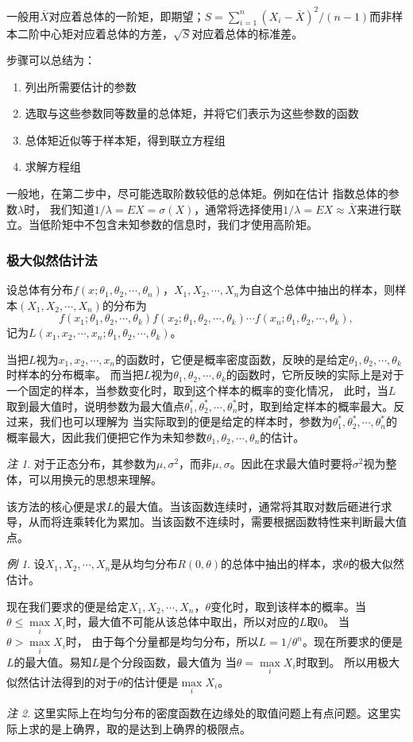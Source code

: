 \documentclass[a4paper,11pt]{article}%
\theoremstyle{remark}
\newtheorem*{remark}{注}
\theoremstyle{remark}
\newtheorem*{example}{例}
\theoremstyle{definition}
\theoremstyle{definition}
\theoremstyle{plain}
\begin{document}
一般用$\bar{X}$对应着总体的一阶矩，即期望；$S=\sum_{i=1}^{n}(X_i-\bar{X})^2/(n-1)$而非样本二阶中心矩对应着总体的方差，$\sqrt{S}$对应着总体的标准差。

步骤可以总结为：
\begin{enumerate}
    \item 列出所需要估计的参数
    \item 选取与这些参数同等数量的总体矩，并将它们表示为这些参数的函数
    \item 总体矩近似等于样本矩，得到联立方程组
    \item 求解方程组
\end{enumerate}
一般地，在第二步中，尽可能选取阶数较低的总体矩。例如在估计 指数总体的参数$\lambda$时， 我们知道$1/\lambda=EX=\sigma(X)$，通常将选择使用$1/\lambda=EX\approx \bar{X}$来进行联立。当低阶矩中不包含未知参数的信息时，我们才使用高阶矩。
\subsubsection{极大似然估计法}
设总体有分布$f(x;\theta _1,\theta _2,\cdots,\theta _n)$，$X_1,X_2,\cdots,X_n$为自这个总体中抽出的样本，则样本$(X_1,X_2,\cdots,X_n)$的分布为 
\[f(x_1;\theta_1,\theta_2,\cdots,\theta_k)f(x_2;\theta_1,\theta_2,\cdots,\theta_k)\cdots f(x_n;\theta_1,\theta_2,\cdots,\theta_k),\]
记为$L(x_1,x_2,\cdots,x_n;\theta_1,\theta_2,\cdots,\theta_k)$。

当把$L$视为$x_1,x_2,\cdots,x_n$的函数时，它便是概率密度函数，反映的是给定$\theta_1,\theta_2,\cdots,\theta_k$时样本的分布概率。
而当把$L$视为$\theta_1,\theta_2,\cdots,\theta_k$的函数时，它所反映的实际上是对于一个固定的样本，当参数变化时，取到这个样本的概率的变化情况，
此时，当$L$取到最大值时，说明参数为最大值点$\theta_1^*,\theta_2^*,\cdots,\theta_n^*$时，取到给定样本的概率最大。反过来，我们也可以理解为
当实际取到的便是给定的样本时，参数为$\theta_1^*,\theta_2^*,\cdots,\theta_n^*$的概率最大，因此我们便把它作为未知参数$\theta_1,\theta_2,\cdots,\theta_n$的估计。
\begin{remark}
    对于正态分布，其参数为$\mu,\sigma^2$，而非$\mu,\sigma$。因此在求最大值时要将$\sigma^2$视为整体，可以用换元的思想来理解。
\end{remark}

该方法的核心便是求$L$的最大值。当该函数连续时，通常将其取对数后砸进行求导，从而将连乘转化为累加。当该函数不连续时，需要根据函数特性来判断最大值点。
\begin{example}
设$X_1,X_2,\cdots,X_n$是从均匀分布$R(0,\theta)$的总体中抽出的样本，求$\theta$的极大似然估计。

现在我们要求的便是给定$X_1,X_2,\cdots,X_n$，$\theta$变化时，取到该样本的概率。当$\theta\leq \max\limits_i{X_i}$时，最大值不可能从该总体中取出，所以对应的$L$取0。
当$\theta>\max\limits_i{X_i}$时， 由于每个分量都是均匀分布，所以$L=1/\theta^n$。现在所要求的便是$L$的最大值。易知$L$是个分段函数，最大值为 当$\theta =\max\limits_i{X_i}$时取到。
所以用极大似然估计法得到的对于$\theta$的估计便是$\max\limits_i{X_i}$。
\end{example}
\begin{remark}
    这里实际上在均匀分布的密度函数在边缘处的取值问题上有点问题。这里实际上求的是上确界，取的是达到上确界的极限点。
\end{remark}
\end{document}
